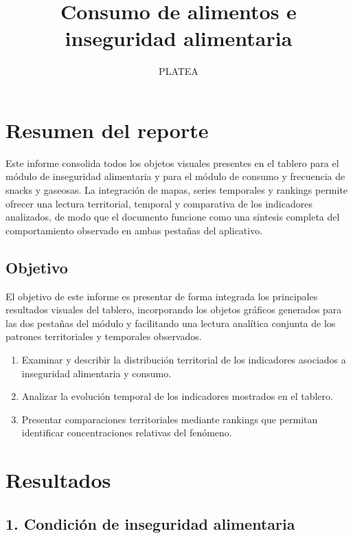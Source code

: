 \documentclass[
]{article}
\title{Consumo de alimentos e inseguridad alimentaria}
\subtitle{PLATEA}
\author{}
\date{\vspace{-2.5em}}
\providecommand{\tightlist}{%
  \setlength{\itemsep}{0pt}\setlength{\parskip}{0pt}}
\begin{document}
\maketitle

{
\setcounter{tocdepth}{2}
\tableofcontents
}
\section{Resumen del reporte}\label{resumen-del-reporte}

Este informe consolida todos los objetos visuales presentes en el
tablero para el módulo de inseguridad alimentaria y para el módulo de
consumo y frecuencia de snacks y gaseosas. La integración de mapas,
series temporales y rankings permite ofrecer una lectura territorial,
temporal y comparativa de los indicadores analizados, de modo que el
documento funcione como una síntesis completa del comportamiento
observado en ambas pestañas del aplicativo.

\subsection{Objetivo}\label{objetivo}

El objetivo de este informe es presentar de forma integrada los
principales resultados visuales del tablero, incorporando los objetos
gráficos generados para las dos pestañas del módulo y facilitando una
lectura analítica conjunta de los patrones territoriales y temporales
observados.

\begin{enumerate}
\def\labelenumi{\arabic{enumi}.}
\tightlist
\item
  Examinar y describir la distribución territorial de los indicadores
  asociados a inseguridad alimentaria y consumo.
\item
  Analizar la evolución temporal de los indicadores mostrados en el
  tablero.
\item
  Presentar comparaciones territoriales mediante rankings que permitan
  identificar concentraciones relativas del fenómeno.
\end{enumerate}

\section{Resultados}\label{resultados}

\subsection{1. Condición de inseguridad
alimentaria}\label{condiciuxf3n-de-inseguridad-alimentaria}
\end{document}
